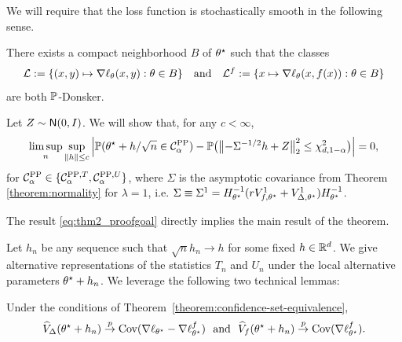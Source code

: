We will require that the loss function is stochastically smooth in the following sense.

\begin{assumption}
  \label{assumption:donsker}
  There exists a compact neighborhood $B$ of $\theta\opt$ such that
  the classes
  \begin{equation*}
    \mc{L} \defeq \{(x, y) \mapsto \nabla \loss_\theta(x, y)
    : \theta \in B \}
    ~~~ \mbox{and} ~~~
    \mc{L}^f
    \defeq \{x \mapsto \nabla \loss_\theta(x, f(x)) : \theta \in B\}
  \end{equation*}
  are both $\P$-Donsker.
\end{assumption}



Let $Z \sim \normal(0, I)$. We will show that,
  for any $c < \infty$,
  \begin{equation}
  \label{eq:thm2_proofgoal}
    \limsup_n
    \sup_{\norm{h} \le c}
    \left|
    \P(\theta\opt + h/\sqrt{n} \in \CPP_\alpha)
    - \P\big(\ltwobig{-\Sigma^{-1/2} h + Z}^2
    \le \chi^2_{d,1-\alpha} \big) \right|
    = 0,
  \end{equation}
  for $\CPP_\alpha \in\{ \C_\alpha^{\mathrm{PP},T}, \C_\alpha^{\mathrm{PP},U}\}$, where $\Sigma$ is the asymptotic covariance from Theorem \ref{theorem:normality} for $\lambda = 1$, i.e. $\Sigma \equiv \Sigma^1 = H_{\theta\opt}^{-1} (r V^1_{f,\theta\opt} + V^1_{\Delta,\theta\opt}) H_{\theta\opt}^{-1}$.
  
The result \eqref{eq:thm2_proofgoal} directly implies the main result of the theorem.
  
  
  
  
  
  Let $h_n$ be any sequence such that $\sqrt{n} h_n \to h$ for some fixed $h
  \in \R^d$.  We give alternative representations of the statistics $T_n$
  and $U_n$ under the local alternative parameters $\theta\opt + h_n$. We
  leverage the following two technical lemmas:
  
  
  
 \begin{lemma}
    \label{lemma:variance-control}
    Under the conditions of Theorem~\ref{theorem:confidence-set-equivalence},
    \begin{equation*}
      \VhatDelta(\theta\opt + h_n)
      \cp \cov(\nabla \loss_{\theta\opt}
      - \nabla \loss_{\theta\opt}^f)
      ~~ \mbox{and} ~~
      \Vhatf(\theta\opt + h_n)
      \cp \cov(\nabla \loss_{\theta\opt}^f).
    \end{equation*}
  \end{lemma}
  
